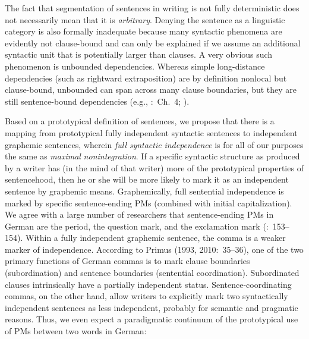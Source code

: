 \begin{styleMoutonTextAfterExample}
The fact that segmentation of sentences in writing is not fully deterministic does not necessarily mean that it is \textit{arbitrary}. Denying the sentence as a linguistic category is also formally inadequate because many syntactic phenomena are evidently not clause-bound and can only be explained if we assume an additional syntactic unit that is potentially larger than clauses. A very obvious such phenomenon is unbounded dependencies. Whereas simple long-distance dependencies (such as rightward extraposition) are by definition nonlocal but clause-bound, unbounded can span across many clause boundaries, but they are still sentence-bound dependencies (e.g., \citealt{PollardSag1994}:~Ch.~4; \citealt{LevineHukari2006}).
\end{styleMoutonTextAfterExample}

\begin{styleMoutonTextBeforeExample}
Based on a prototypical definition of sentences, we propose that there is a mapping from prototypical fully independent syntactic sentences to independent graphemic sentences, wherein \textit{full} \textit{syntactic} \textit{independence} is for all of our purposes the same as \textit{maximal} \textit{nonintegration}. If a specific syntactic structure as produced by a writer has (in the mind of that writer) more of the prototypical properties of sentencehood, then he or she will be more likely to mark it as an independent sentence by graphemic means. Graphemically, full sentential independence is marked by specific sentence-ending PMs (combined with initial capitalization). We agree with a large number of researchers that sentence-ending PMs in German are the period, the question mark, and the exclamation mark (\citealt{Dürscheid2006}:~153–154). Within a fully independent graphemic sentence, the comma is a weaker marker of independence. According to Primus (1993, 2010:~35–36), one of the two primary functions of German commas is to mark clause boundaries (subordination) and sentence boundaries (sentential coordination). Subordinated clauses intrinsically have a partially independent status. Sentence-coordinating commas, on the other hand, allow writers to explicitly mark two syntactically independent sentences as less independent, probably for semantic and pragmatic reasons. Thus, we even expect a paradigmatic continuum of the prototypical use of PMs between two words in German:
\end{styleMoutonTextBeforeExample}

